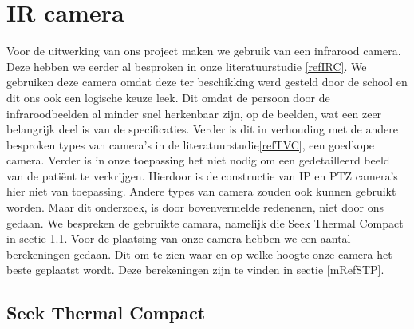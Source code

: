 \section{IR camera}
\label{MRefIRC}
Voor de uitwerking van ons project maken we gebruik van een infrarood camera. Deze hebben we eerder al besproken in onze literatuurstudie \ref{refIRC}. We gebruiken deze camera omdat deze ter beschikking werd gesteld door de school en dit ons ook een logische keuze leek. Dit omdat de persoon door de infraroodbeelden al minder snel herkenbaar zijn, op de beelden, wat een zeer belangrijk deel is van de specificaties. Verder is dit in verhouding met de andere besproken types van camera's in de literatuurstudie\ref{refTVC}, een goedkope camera. Verder is in onze toepassing het niet nodig om een gedetailleerd beeld van de pati\"ent te verkrijgen. Hierdoor is de constructie van IP en PTZ camera's hier niet van toepassing. Andere types van camera zouden ook kunnen gebruikt worden. Maar dit onderzoek, is door bovenvermelde redenenen, niet door ons gedaan. We bespreken de gebruikte camara, namelijk die Seek Thermal Compact in sectie \ref{mRefSTh}. Voor de plaatsing van onze camera hebben we een aantal berekeningen gedaan. Dit om te zien waar en op welke hoogte onze camera het beste geplaatst wordt. Deze berekeningen zijn te vinden in sectie \ref{mRefSTP}.

\subsection{Seek Thermal Compact}
\label{mRefSTh}

